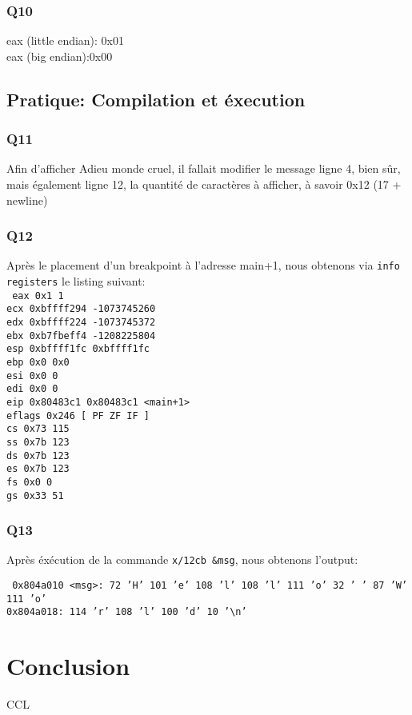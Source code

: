 \documentclass[12pt,a4paper,oneside]{article}
\begin{document}
\subsubsection{Q10}
eax (little endian): 0x01\\
eax (big endian):0x00

\subsection{Pratique: Compilation et éxecution}
\subsubsection{Q11}
Afin d'afficher Adieu monde cruel, il fallait modifier le message ligne 4, bien sûr, mais également ligne 12, la quantité de caractères à afficher, à savoir 0x12 (17 + newline)



\subsubsection{Q12}
Après le placement d'un breakpoint à l'adresse main+1, nous obtenons via \texttt{info registers} le listing suivant:\\
\texttt{
eax            0x1  1\\
ecx            0xbffff294   -1073745260\\
edx            0xbffff224   -1073745372\\
ebx            0xb7fbeff4   -1208225804\\
esp            0xbffff1fc   0xbffff1fc\\
ebp            0x0  0x0\\
esi            0x0  0\\
edi            0x0  0\\
eip            0x80483c1    0x80483c1 <main+1>\\
eflags         0x246    [ PF ZF IF ]\\
cs             0x73 115\\
ss             0x7b 123\\
ds             0x7b 123\\
es             0x7b 123\\
fs             0x0  0\\
gs             0x33 51\\
}

\subsubsection{Q13}
Après éxécution de la commande \texttt{x/12cb \&msg}, nous obtenons l'output:

\texttt{
0x804a010 <msg>:    72 'H'  101 'e' 108 'l' 108 'l' 111 'o' 32 ' '  87 'W'  111 'o'\\
0x804a018:  114 'r' 108 'l' 100 'd' 10 '\textbackslash n'
}
\newpage
\section{Conclusion}
CCL
\end{document}
